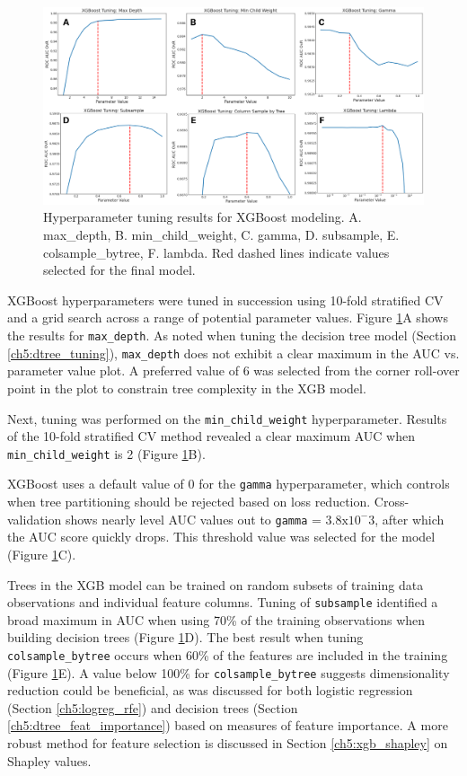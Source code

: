 \begin{figure}[!htp]
\centering
\includegraphics[width=\textwidth]{templates/images/Figure-XGB_Hyperparameters.png}
\caption[XGBoost hyperparameter tuning]{Hyperparameter tuning results for XGBoost modeling. A. max\_depth, B. min\_child\_weight, C. gamma, D. subsample, E. colsample\_bytree, F. lambda. Red dashed lines indicate values selected for the final model.}
\label{fig:xgb_hyperparam}
\end{figure}

XGBoost hyperparameters were tuned in succession using 10-fold stratified CV and a grid search across a range of potential parameter values. Figure \ref{fig:xgb_hyperparam}A shows the results for \verb|max_depth|. As noted when tuning the decision tree model (Section \ref{ch5:dtree_tuning}), \verb|max_depth| does not exhibit a clear maximum in the AUC vs. parameter value plot. A preferred value of 6 was selected from the corner roll-over point in the plot to constrain tree complexity in the XGB model.

Next, tuning was performed on the \verb|min_child_weight| hyperparameter. Results of the 10-fold stratified CV method revealed a clear maximum AUC when \verb|min_child_weight| is 2 (Figure \ref{fig:xgb_hyperparam}B).

XGBoost uses a default value of 0 for the \verb|gamma| hyperparameter, which controls when tree partitioning should be rejected based on loss reduction. Cross-validation shows nearly level AUC values out to \verb|gamma| = $3.8 \text{x} 10^-3$, after which the AUC score quickly drops. This threshold value was selected for the model (Figure \ref{fig:xgb_hyperparam}C).

Trees in the XGB model can be trained on random subsets of training data observations and individual feature columns. Tuning of \verb|subsample| identified a broad maximum in AUC when using 70\% of the training observations when building decision trees (Figure \ref{fig:xgb_hyperparam}D). The best result when tuning \verb|colsample_bytree| occurs when 60\% of the features are included in the training (Figure \ref{fig:xgb_hyperparam}E). A value below 100\% for \verb|colsample_bytree| suggests dimensionality reduction could be beneficial, as was discussed for both logistic regression (Section \ref{ch5:logreg_rfe}) and decision trees (Section \ref{ch5:dtree_feat_importance}) based on measures of feature importance. A more robust method for feature selection is discussed in Section \ref{ch5:xgb_shapley} on Shapley values.

